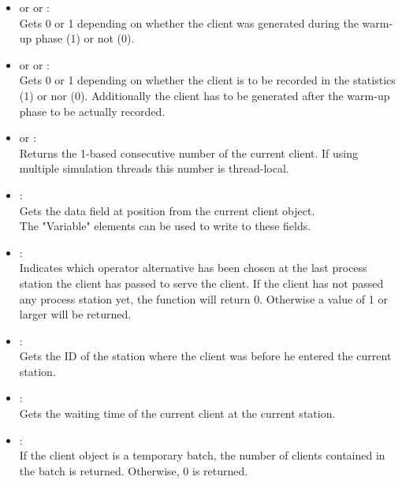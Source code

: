 \begin{itemize}

\item
{} or  or :\\
Gets 0 or 1 depending on whether the client was generated during the warm-up phase (1) or not (0).

\item
{} or  or :\\
Gets 0 or 1 depending on whether the client is to be recorded in the statistics (1) or nor (0). Additionally the client has to be generated after the warm-up phase to be actually recorded.

\item
{} or :\\
Returns the 1-based consecutive number of the current client. If using multiple simulation threads this number is thread-local.

\item
{}:\\
Gets the data field at position  from the current client object.\\
The "Variable" elements can be used to write to these fields.

\item
{}:\\
Indicates which operator alternative has been chosen at the last process station the client has passed to serve the client. If the client has not passed any process station yet, the function will return 0. Otherwise a value of 1 or larger will be returned.

\item
{}:\\
Gets the ID of the station where the client was before he entered the current station.

\item
{}:\\
Gets the waiting time of the current client at the current station.

\item
{}:\\
If the client object is a temporary batch, the number of clients contained in the batch is returned. Otherwise, 0 is returned.

\end{itemize}



